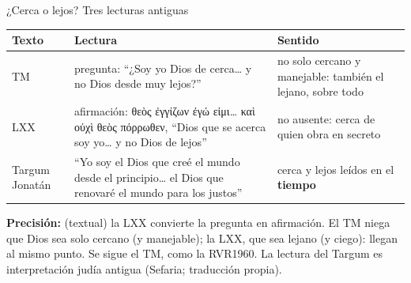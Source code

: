 \documentclass[hyperref={bookmarks=false},aspectratio=169]{beamer}
\newcommand{\grc}[1]{\foreignlanguage{ancientgreek}{#1}}
\newcommand{\destacar}[1]{\textbf{\textcolor{azul}{#1}}}
\newcommand{\precision}[1]{{\footnotesize\color{gris}\textbf{Precisión:} #1}}
\begin{document}
\begin{frame}{¿Cerca o lejos? Tres lecturas antiguas}
\scriptsize\renewcommand{\arraystretch}{1.18}
\begin{tabular}{@{}>{\RaggedRight\arraybackslash}p{2.0cm}>{\RaggedRight\arraybackslash}p{5.2cm}>{\RaggedRight\arraybackslash}p{4.6cm}@{}}
\toprule
\textbf{Texto} & \textbf{Lectura} & \textbf{Sentido} \\ \midrule
TM & pregunta: ``¿Soy yo Dios de cerca\ldots{} y no Dios desde muy lejos?'' & no solo cercano y manejable: también el lejano, sobre todo \\
LXX & afirmación: \grc{θεὸς ἐγγίζων ἐγώ εἰμι\ldots{} καὶ οὐχὶ θεὸς πόρρωθεν}, ``Dios que se acerca soy yo\ldots{} y no Dios de lejos'' & no ausente: cerca de quien obra en secreto \\
Targum Jonatán & ``Yo soy el Dios que creé el mundo desde el principio\ldots{} el Dios que renovaré el mundo para los justos'' & cerca y lejos leídos en el \destacar{tiempo} \\
\bottomrule
\end{tabular}\par\medskip
\precision{(textual) la LXX convierte la pregunta en afirmación. El TM niega que Dios sea solo cercano (y manejable); la LXX, que sea lejano (y ciego): llegan al mismo punto. Se sigue el TM, como la RVR1960. La lectura del Targum es interpretación judía antigua (Sefaria; traducción propia).}
\end{frame}
\end{document}
